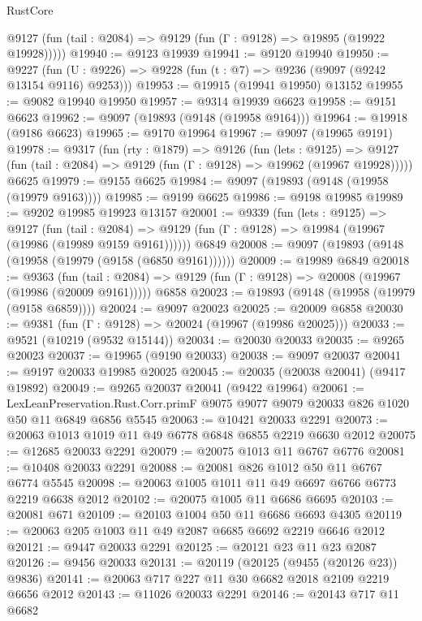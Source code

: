 \begin{lexlean}{RustCore}
\begin{coremodule}
      @9127 (fun (tail : @2084) => @9129 (fun (Γ : @9128) => @19895 (@19922 @19928)))))
@19940 := @9123 @19939
@19941 := @9120 @19940
@19950 := @9227
    (fun (U : @9226) => @9228 (fun (t : @7) => @9236 (@9097 (@9242 @13154 @9116) @9253)))
@19953 := @19915 (@19941 @19950) @13152
@19955 := @9082 @19940 @19950
@19957 := @9314 @19939 @6623
@19958 := @9151 @6623
@19962 := @9097 (@19893 (@9148 (@19958 @9164)))
@19964 := @19918 (@9186 @6623)
@19965 := @9170 @19964
@19967 := @9097 (@19965 @9191)
@19978 := @9317
    (fun (rty : @1879) =>
    @9126
      (fun (lets : @9125) =>
      @9127 (fun (tail : @2084) => @9129 (fun (Γ : @9128) => @19962 (@19967 @19928)))))
    @6625
@19979 := @9155 @6625
@19984 := @9097 (@19893 (@9148 (@19958 (@19979 @9163))))
@19985 := @9199 @6625
@19986 := @9198 @19985
@19989 := @9202 @19985 @19923 @13157
@20001 := @9339
    (fun (lets : @9125) =>
    @9127
      (fun (tail : @2084) =>
      @9129 (fun (Γ : @9128) => @19984 (@19967 (@19986 (@19989 @9159 @9161))))))
    @6849
@20008 := @9097 (@19893 (@9148 (@19958 (@19979 (@9158 (@6850 @9161))))))
@20009 := @19989 @6849
@20018 := @9363
    (fun (tail : @2084) => @9129 (fun (Γ : @9128) => @20008 (@19967 (@19986 (@20009 @9161)))))
    @6858
@20023 := @19893 (@9148 (@19958 (@19979 (@9158 @6859))))
@20024 := @9097 @20023
@20025 := @20009 @6858
@20030 := @9381 (fun (Γ : @9128) => @20024 (@19967 (@19986 @20025)))
@20033 := @9521 (@10219 (@9532 @15144))
@20034 := @20030 @20033
@20035 := @9265 @20023
@20037 := @19965 (@9190 @20033)
@20038 := @9097 @20037
@20041 := @9197 @20033 @19985 @20025
@20045 := @20035 (@20038 @20041) (@9417 @19892)
@20049 := @9265 @20037 @20041 (@9422 @19964)
@20061 := LexLeanPreservation.Rust.Corr.primF
    @9075
    @9077
    @9079
    @20033
    @826
    @1020
    @50
    @11
    @6849
    @6856
    @5545
@20063 := @10421 @20033 @2291
@20073 := @20063 @1013 @1019 @11 @49 @6778 @6848 @6855 @2219 @6630 @2012
@20075 := @12685 @20033 @2291
@20079 := @20075 @1013 @11 @6767 @6776
@20081 := @10408 @20033 @2291
@20088 := @20081 @826 @1012 @50 @11 @6767 @6774 @5545
@20098 := @20063 @1005 @1011 @11 @49 @6697 @6766 @6773 @2219 @6638 @2012
@20102 := @20075 @1005 @11 @6686 @6695
@20103 := @20081 @671
@20109 := @20103 @1004 @50 @11 @6686 @6693 @4305
@20119 := @20063 @205 @1003 @11 @49 @2087 @6685 @6692 @2219 @6646 @2012
@20121 := @9447 @20033 @2291
@20125 := @20121 @23 @11 @23 @2087
@20126 := @9456 @20033
@20131 := @20119 (@20125 (@9455 (@20126 @23)) @9836)
@20141 := @20063 @717 @227 @11 @30 @6682 @2018 @2109 @2219 @6656 @2012
@20143 := @11026 @20033 @2291
@20146 := @20143 @717 @11 @6682

\end{coremodule}
\end{lexlean}
